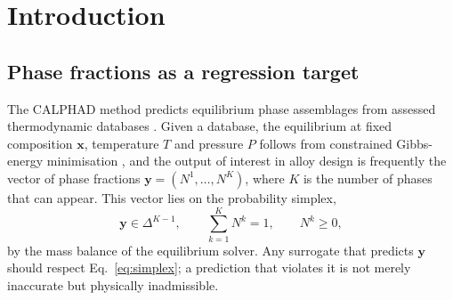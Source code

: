 \documentclass[preprint,12pt,authoryear]{elsarticle}
\newcommand{\Np}[1]{N^{#1}}
\newcommand{\Dk}{\Delta^{K-1}}
\begin{document}
\section{Introduction}
\label{sec:intro}

\subsection{Phase fractions as a regression target}

The CALPHAD method predicts equilibrium phase assemblages from assessed
thermodynamic databases \citep{saunders1998calphad,lukas2007computational}.
Given a database, the equilibrium at fixed composition $\mathbf{x}$,
temperature $T$ and pressure $P$ follows from constrained Gibbs-energy
minimisation \citep{connolly2017primer}, and the output of interest in alloy design is frequently the
vector of phase fractions $\mathbf{y} = (\Np{1}, \ldots, \Np{K})$, where
$K$ is the number of phases that can appear. This vector lies on the
probability simplex,
\begin{equation}
    \mathbf{y} \in \Dk, \qquad
    \sum_{k=1}^{K} \Np{k} = 1, \qquad \Np{k} \ge 0,
    \label{eq:simplex}
\end{equation}
by the mass balance of the equilibrium solver. Any surrogate that predicts
$\mathbf{y}$ should respect Eq.~\eqref{eq:simplex}; a prediction that
violates it is not merely inaccurate but physically inadmissible.
\end{document}
